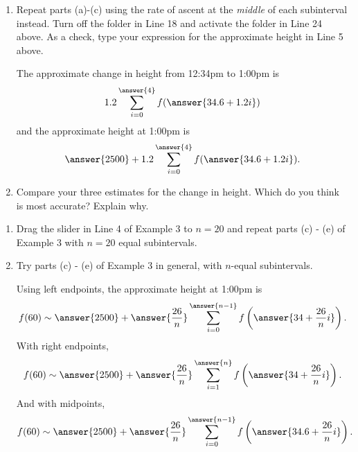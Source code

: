 \documentclass{ximera}
\begin{document}
\begin{example}
\begin{enumerate}
\item Repeat parts (a)-(c) using the rate of ascent at the \emph{middle} of each subinterval instead. Turn off the folder in Line 18 and activate the folder in Line 24 above. As a check, type your expression for the approximate height in Line 5 above.

The approximate change in height from 12:34pm to 1:00pm is
\[
  1.2 \sum_{i=0}^{\answer{4}} f(\answer{34.6+ 1.2i})  
\]
and the approximate height at 1:00pm is
\[
     \answer{2500} + 1.2 \sum_{i=0}^{\answer{4}} f(\answer{34.6 + 1.2i})  .
\]

\item Compare your three estimates for the change in height. Which do you think is most accurate? Explain why.

\end{enumerate}
\end{example} 

\begin{example}  \label{Ex:IjdRJrehreDF}
\begin{enumerate}
\item  Drag the slider in Line 4 of Example 3 to $n=20$ and repeat parts (c) - (e) of Example 3 with $n=20$ equal subintervals. 

\item Try parts (c) - (e) of Example 3 in general, with $n$-equal subintervals.

Using left endpoints, the approximate height at 1:00pm is
\[
        f(60) \sim   \answer{2500} +  \answer{\frac{26}{n}} \sum_{i=0}^{\answer{n-1}} f\left(\answer{34+ \frac{26}{n}i}\right)  .
\]
With right endpoints,
\[
        f(60) \sim   \answer{2500} +  \answer{\frac{26}{n}} \sum_{i=1}^{\answer{n}} f\left(\answer{34+ \frac{26}{n}i}\right)  .
\]
And with midpoints,
\[
        f(60) \sim   \answer{2500} +  \answer{\frac{26}{n}} \sum_{i=0}^{\answer{n-1}} f\left(\answer{34.6+ \frac{26}{n}i}\right)  .
\]

\end{enumerate}
\end{example}
\end{document}
